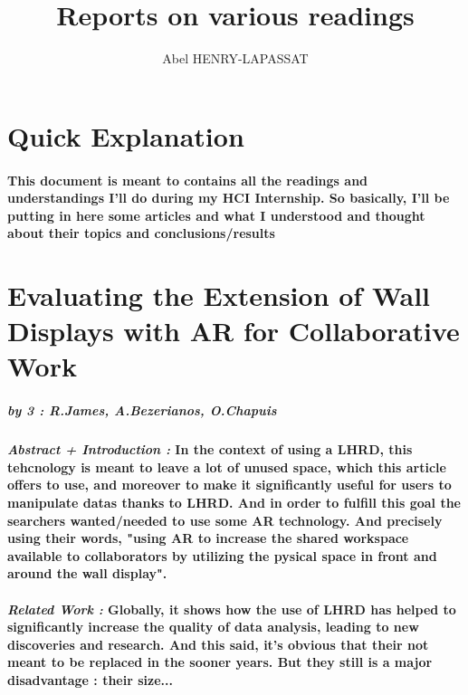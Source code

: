 \documentclass{article}
\title{Reports on various readings}
\author{Abel HENRY-LAPASSAT}
\begin{document}
\maketitle
\section{Quick Explanation}
    \paragraph{ \textnormal{This document is meant to contains all the readings and understandings I'll do during my HCI Internship.
        So basically, I'll be putting in here some articles and what I understood and thought about their topics and conclusions/results} }

\section{Evaluating the Extension of Wall Displays with AR for Collaborative Work}
    \subparagraph{by 3 : R.James, A.Bezerianos, O.Chapuis}

    \paragraph{ \textit{Abstract + Introduction :}
                \newline
                \textnormal{In the context of using a LHRD, this tehcnology is meant to leave a lot of unused space, which this article offers to
                use, and moreover to make it significantly useful for users to manipulate datas thanks to LHRD. And in order to fulfill this goal
                the searchers wanted/needed to use some AR technology. And precisely using their words, "using AR to increase the shared
                workspace available to collaborators by utilizing the pysical space in front and around the wall display".}}
    \paragraph{ \textit{Related Work :}
                \newline
                \textnormal{Globally, it shows how the use of LHRD has helped to significantly increase the quality of data analysis, leading to 
                new discoveries and research. And this said, it's obvious that their not meant to be replaced in the sooner years. But they still
                is a major disadvantage : their size...}
                \newline
                \textnormal{}}
\end{document}
